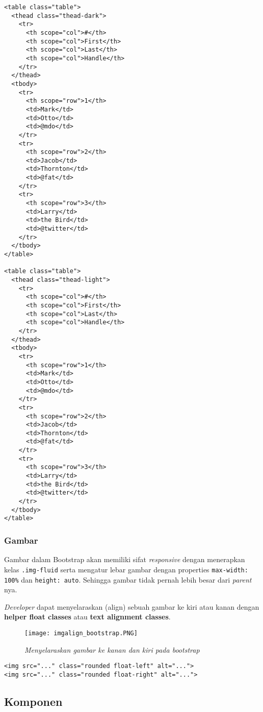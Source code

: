 \begin{lstlisting}[frame=single] 
<table class="table">
  <thead class="thead-dark">
    <tr>
      <th scope="col">#</th>
      <th scope="col">First</th>
      <th scope="col">Last</th>
      <th scope="col">Handle</th>
    </tr>
  </thead>
  <tbody>
    <tr>
      <th scope="row">1</th>
      <td>Mark</td>
      <td>Otto</td>
      <td>@mdo</td>
    </tr>
    <tr>
      <th scope="row">2</th>
      <td>Jacob</td>
      <td>Thornton</td>
      <td>@fat</td>
    </tr>
    <tr>
      <th scope="row">3</th>
      <td>Larry</td>
      <td>the Bird</td>
      <td>@twitter</td>
    </tr>
  </tbody>
</table>

<table class="table">
  <thead class="thead-light">
    <tr>
      <th scope="col">#</th>
      <th scope="col">First</th>
      <th scope="col">Last</th>
      <th scope="col">Handle</th>
    </tr>
  </thead>
  <tbody>
    <tr>
      <th scope="row">1</th>
      <td>Mark</td>
      <td>Otto</td>
      <td>@mdo</td>
    </tr>
    <tr>
      <th scope="row">2</th>
      <td>Jacob</td>
      <td>Thornton</td>
      <td>@fat</td>
    </tr>
    <tr>
      <th scope="row">3</th>
      <td>Larry</td>
      <td>the Bird</td>
      <td>@twitter</td>
    </tr>
  </tbody>
</table>
\end{lstlisting}

\subsubsection{Gambar}
Gambar dalam Bootstrap akan memiliki sifat \textit{responsive} dengan menerapkan kelas \texttt{.img-fluid} serta mengatur lebar gambar dengan properties \texttt{max-width: 100\%} dan \texttt{height: auto}. Sehingga gambar tidak pernah lebih besar dari \textit{parent} nya. 

\textit{Developer} dapat menyelaraskan (align) sebuah gambar ke kiri atau kanan dengan \textbf{helper float classes} atau \textbf{text alignment classes}. 
\begin{figure} [H]
	\centering  
	\texttt{[image: imgalign\_bootstrap.PNG]}  
	\caption{\it{Menyelaraskan gambar ke kanan dan kiri pada bootstrap}} 
\end{figure}
\begin{lstlisting}[frame=single]
<img src="..." class="rounded float-left" alt="...">
<img src="..." class="rounded float-right" alt="...">
\end{lstlisting}



\subsection{Komponen}
